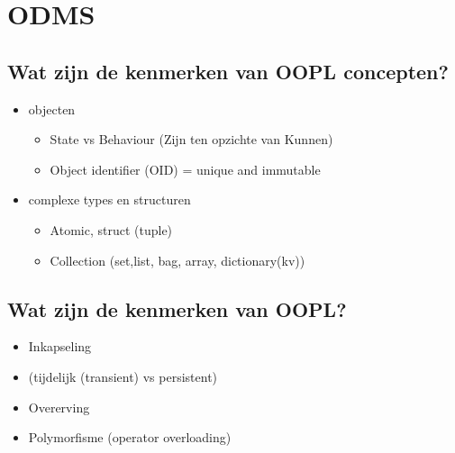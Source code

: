 \newpage
\section{ODMS}

\subsection{Wat zijn de kenmerken van OOPL concepten?}


\begin{itemize}
\item objecten

\begin{itemize}
\item State vs Behaviour (Zijn ten opzichte van Kunnen)
\item Object identifier (OID) = unique and immutable
\end{itemize}


\item complexe types en structuren
\begin{itemize}
\item Atomic, struct (tuple)
\item Collection (set,list, bag, array, dictionary(kv))
\end{itemize}

\end{itemize}

\subsection{Wat zijn de kenmerken van OOPL?}

\begin{itemize}
\item Inkapseling
\item (tijdelijk (transient) vs persistent)
\item Overerving
\item Polymorfisme (operator overloading)
\end{itemize}